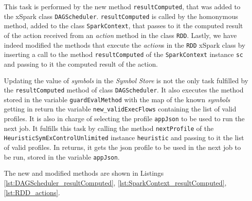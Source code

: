 This task is performed by the new method \texttt{resultComputed}, that was added to the xSpark class \texttt{DAGScheduler}. \texttt{resultComputed} is called by the homonymous method, added to the class \texttt{SparkContext}, that passes to it the computed result of the action received from an \textit{action} method in the class \texttt{RDD}. 
Lastly, we have indeed modified the methods that execute the \textit{action}s in the \texttt{RDD} xSpark class by inserting a call to the method \texttt{resultComputed} of the \texttt{SparkContext} instance \texttt{sc} and passing to it the computed result of the action. 

Updating the value of \textit{symbols} in the \textit{Symbol Store} is not the only task fulfilled by the \texttt{resultComputed} method of class \texttt{DAGScheduler}. It also executes the method stored in the variable \texttt{guardEvalMethod} with the map of the known \textit{symbols} getting in return the variable \texttt{new\_validExecFlows} containing the list of valid profiles. It is also in charge of selecting the profile \texttt{appJson} to be used to run the next job. It fulfills this task by calling the method \texttt{nextProfile} of the \texttt{HeuristicSymExControlUnlimited} instance \texttt{heuristic} and passing to it the list of valid profiles. In returns, it gets the json profile to be used in the next job to be run, stored in the variable \texttt{appJson}. 

The new and modified methods are shown in Listings \ref{lst:DAGScheduler_resultComputed}, \ref{lst:SparkContext_resultComputed}, \ref{lst:RDD_actions}.


\vspace{1cm}

\vspace{1cm}



